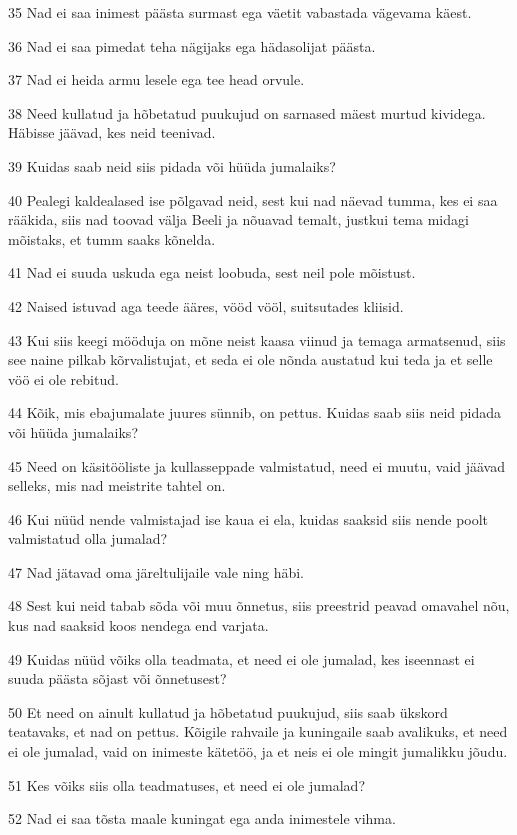 \par 35 Nad ei saa inimest päästa surmast ega väetit vabastada vägevama  käest.
\par 36 Nad ei saa pimedat teha nägijaks ega hädasolijat päästa.
\par 37 Nad ei heida armu lesele ega tee head orvule.
\par 38 Need kullatud ja hõbetatud  puukujud on sarnased mäest murtud kividega. Häbisse jäävad, kes neid  teenivad.
\par 39 Kuidas saab neid siis pidada või hüüda jumalaiks?
\par 40 Pealegi kaldealased ise põlgavad neid, sest kui nad näevad  tumma, kes ei saa rääkida, siis nad toovad välja Beeli ja nõuavad  temalt, justkui tema midagi mõistaks, et tumm saaks kõnelda.
\par 41 Nad ei suuda uskuda ega neist loobuda, sest neil pole  mõistust.
\par 42 Naised istuvad aga teede ääres, vööd vööl, suitsutades kliisid.
\par 43 Kui siis keegi mööduja on mõne neist kaasa viinud ja temaga  armatsenud, siis see naine pilkab kõrvalistujat, et seda ei ole nõnda  austatud kui teda ja et selle vöö ei ole rebitud.
\par 44 Kõik, mis ebajumalate juures sünnib, on pettus. Kuidas saab siis  neid pidada või hüüda jumalaiks?
\par 45 Need on käsitööliste ja kullasseppade valmistatud, need ei  muutu, vaid jäävad selleks, mis nad meistrite tahtel on.
\par 46 Kui nüüd nende valmistajad ise kaua ei ela, kuidas saaksid siis  nende poolt valmistatud olla jumalad?
\par 47 Nad jätavad oma järeltulijaile vale ning häbi.
\par 48 Sest kui neid tabab sõda või muu õnnetus, siis preestrid peavad  omavahel nõu, kus nad saaksid koos nendega end varjata.
\par 49 Kuidas nüüd võiks olla teadmata, et need ei ole jumalad, kes  iseennast ei suuda päästa sõjast või õnnetusest?
\par 50 Et need on ainult kullatud ja hõbetatud puukujud, siis saab  ükskord teatavaks, et nad on pettus. Kõigile rahvaile ja kuningaile  saab avalikuks, et need ei ole jumalad, vaid on inimeste kätetöö, ja  et neis ei  ole mingit jumalikku jõudu.
\par 51 Kes võiks siis olla teadmatuses, et need ei ole jumalad?
\par 52 Nad ei saa tõsta maale kuningat ega anda inimestele vihma.
